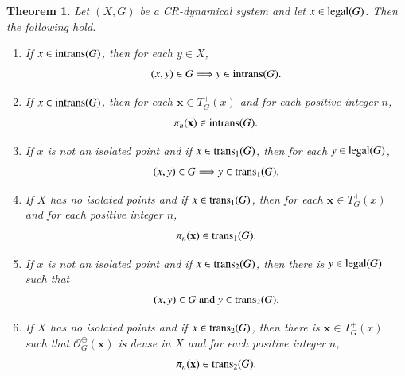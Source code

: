 \documentclass[a4paper,12pt]{article} %
\newcommand{\orbit}{\mathcal{O}^{\oplus}}
\newcommand{\legal}{\textup{legal}}
\newcommand{\tplus}{T^{+}}
\newcommand{\trans}{\textup{trans}}
\newcommand{\intrans}{\textup{intrans}}
\newtheorem{theorem}{Theorem}[section]
\begin{document}
\begin{theorem}\label{319}
Let $(X,G)$ be a CR-dynamical system and let $x\in \legal(G)$. Then the following hold.
\begin{enumerate}
\item\label{1} If $x\in \intrans(G)$, then for each $y\in X$,
$$
(x,y)\in G \Longrightarrow  y\in \intrans(G).
$$
\item\label{2} If $x\in \intrans(G)$, then for each $\mathbf x\in \tplus_G(x)$ and for each positive integer $n$, 
$$
\pi_n(\mathbf x)\in \intrans(G).
$$
\item\label{3} If $x$ is  not an isolated point and if $x\in \trans_1(G)$, then for each $y\in \legal(G)$,
$$
(x,y)\in G \Longrightarrow  y\in \trans_1(G).
$$
\item\label{4} If $X$ has  no isolated points and if $x\in \trans_1(G)$, then for each $\mathbf x\in \tplus_G(x)$ and for each positive integer $n$,
$$
\pi_n(\mathbf x)\in \trans_1(G).
$$
\item\label{5} If $x$ is  not an isolated point and if $x\in \trans_2(G)$, then there is $y\in \legal(G)$ such that
$$
(x,y)\in G \textup{ and }  y\in \trans_2(G).
$$
\item\label{6} If $X$ has  no isolated points  and if $x\in \trans_2(G)$, then there is $\mathbf x\in \tplus_G(x)$ such that $\orbit_G(\mathbf x)$ is dense in $X$ and for each positive integer $n$,
$$
\pi_n(\mathbf x)\in \trans_2(G).
$$
\end{enumerate}
\end{theorem}
\end{document}
